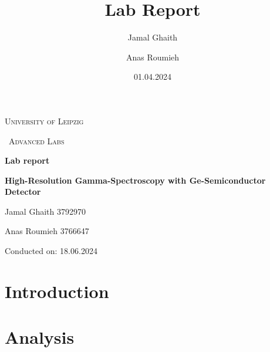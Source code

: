 \documentclass{article}
\title{Lab Report}
\author{Jamal Ghaith}
\author{Anas Roumieh}
\date{01.04.2024}
\begin{document}
\begin{titlepage}
	\centering
	{\scshape\LARGE University of Leipzig \par}
	\vspace{1cm}
	{\scshape\ Advanced Labs\par}
	\vspace{1.5cm}
	{\huge\bfseries Lab report\par}
	\vspace{2cm}
	{\huge\bfseries High-Resolution Gamma-Spectroscopy with Ge-Semiconductor Detector\par}
	\vspace{2cm}
	{\Large Jamal Ghaith 3792970\par}
    {\Large Anas Roumieh 3766647\par}
	\vfill

    {\Large Conducted on: 18.06.2024 \par}
	\vfill
\end{titlepage}


\tableofcontents
{}
\pagebreak{}

\section{Introduction}

\pagebreak{}

\section{Analysis}
\end{document}
